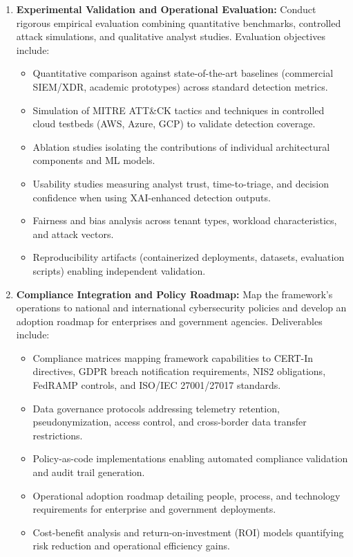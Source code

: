 \begin{enumerate}[label=\textbf{O\arabic*}]
    \item \textbf{Experimental Validation and Operational Evaluation:} Conduct rigorous empirical evaluation combining quantitative benchmarks, controlled attack simulations, and qualitative analyst studies. Evaluation objectives include:
    \begin{itemize}
        \item Quantitative comparison against state-of-the-art baselines (commercial SIEM/XDR, academic prototypes) across standard detection metrics.
        \item Simulation of MITRE ATT\&CK tactics and techniques in controlled cloud testbeds (AWS, Azure, GCP) to validate detection coverage.
        \item Ablation studies isolating the contributions of individual architectural components and ML models.
        \item Usability studies measuring analyst trust, time-to-triage, and decision confidence when using XAI-enhanced detection outputs.
        \item Fairness and bias analysis across tenant types, workload characteristics, and attack vectors.
        \item Reproducibility artifacts (containerized deployments, datasets, evaluation scripts) enabling independent validation.
    \end{itemize}
    
    \item \textbf{Compliance Integration and Policy Roadmap:} Map the framework's operations to national and international cybersecurity policies and develop an adoption roadmap for enterprises and government agencies. Deliverables include:
    \begin{itemize}
        \item Compliance matrices mapping framework capabilities to CERT-In directives, GDPR breach notification requirements, NIS2 obligations, FedRAMP controls, and ISO/IEC 27001/27017 standards.
        \item Data governance protocols addressing telemetry retention, pseudonymization, access control, and cross-border data transfer restrictions.
        \item Policy-as-code implementations enabling automated compliance validation and audit trail generation.
        \item Operational adoption roadmap detailing people, process, and technology requirements for enterprise and government deployments.
        \item Cost-benefit analysis and return-on-investment (ROI) models quantifying risk reduction and operational efficiency gains.
    \end{itemize}
\end{enumerate}

